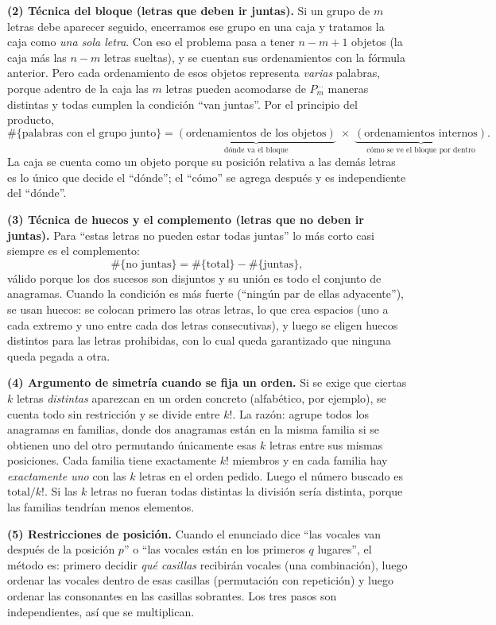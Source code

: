 \documentclass[11pt]{article}
\begin{document}
\begin{teo}
\medskip
\textbf{(2) Técnica del bloque (letras que deben ir juntas).} Si un grupo de $m$ letras debe aparecer
seguido, encerramos ese grupo en una caja y tratamos la caja como \emph{una sola letra}. Con eso el
problema pasa a tener $n-m+1$ objetos (la caja más las $n-m$ letras sueltas), y se cuentan sus
ordenamientos con la fórmula anterior. Pero cada ordenamiento de esos objetos representa \emph{varias}
palabras, porque adentro de la caja las $m$ letras pueden acomodarse de $P_m^{\dots}$ maneras distintas y
todas cumplen la condición ``van juntas''. Por el principio del producto,
\[
\#\{\text{palabras con el grupo junto}\}=
\underbrace{(\text{ordenamientos de los objetos})}_{\text{dónde va el bloque}}
\;\times\;
\underbrace{(\text{ordenamientos internos})}_{\text{cómo se ve el bloque por dentro}}.
\]
La caja se cuenta como un objeto porque su posición relativa a las demás letras es lo único que decide
el ``dónde''; el ``cómo'' se agrega después y es independiente del ``dónde''.

\medskip
\textbf{(3) Técnica de huecos y el complemento (letras que no deben ir juntas).} Para ``estas letras no
pueden estar todas juntas'' lo más corto casi siempre es el complemento:
\[
\#\{\text{no juntas}\}=\#\{\text{total}\}-\#\{\text{juntas}\},
\]
válido porque los dos sucesos son disjuntos y su unión es todo el conjunto de anagramas. Cuando la
condición es más fuerte (``ningún par de ellas adyacente''), se usan huecos: se colocan primero las otras
letras, lo que crea espacios (uno a cada extremo y uno entre cada dos letras consecutivas), y luego se
eligen huecos distintos para las letras prohibidas, con lo cual queda garantizado que ninguna queda pegada
a otra.

\medskip
\textbf{(4) Argumento de simetría cuando se fija un orden.} Si se exige que ciertas $k$ letras
\emph{distintas} aparezcan en un orden concreto (alfabético, por ejemplo), se cuenta todo sin restricción
y se divide entre $k!$. La razón: agrupe todos los anagramas en familias, donde dos anagramas están en la
misma familia si se obtienen uno del otro permutando únicamente esas $k$ letras entre sus mismas
posiciones. Cada familia tiene exactamente $k!$ miembros y en cada familia hay \emph{exactamente uno} con
las $k$ letras en el orden pedido. Luego el número buscado es $\text{total}/k!$. Si las $k$ letras no
fueran todas distintas la división sería distinta, porque las familias tendrían menos elementos.

\medskip
\textbf{(5) Restricciones de posición.} Cuando el enunciado dice ``las vocales van después de la posición
$p$'' o ``las vocales están en los primeros $q$ lugares'', el método es: primero decidir \emph{qué
casillas} recibirán vocales (una combinación), luego ordenar las vocales dentro de esas casillas
(permutación con repetición) y luego ordenar las consonantes en las casillas sobrantes. Los tres pasos son
independientes, así que se multiplican.


\end{teo}
\end{document}
